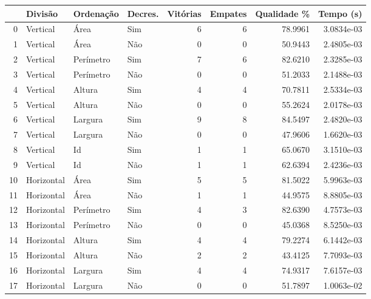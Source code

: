 \begin{tabular}{rlllrrrr}
    \hline
    & Divisão     & Ordenação & Decres. & Vitórias & Empates & Qualidade \% & Tempo (s)  \\
    \hline
    0  & Vertical    & Área      & Sim     & 6        & 6       & 78.9961      & 3.0834e-03 \\
    1  & Vertical    & Área      & Não     & 0        & 0       & 50.9443      & 2.4805e-03 \\
    2  & Vertical    & Perímetro & Sim     & 7        & 6       & 82.6210      & 2.3285e-03 \\
    3  & Vertical    & Perímetro & Não     & 0        & 0       & 51.2033      & 2.1488e-03 \\
    4  & Vertical    & Altura    & Sim     & 4        & 4       & 70.7811      & 2.5334e-03 \\
    5  & Vertical    & Altura    & Não     & 0        & 0       & 55.2624      & 2.0178e-03 \\
    6  & Vertical    & Largura   & Sim     & 9        & 8       & 84.5497      & 2.4820e-03 \\
    7  & Vertical    & Largura   & Não     & 0        & 0       & 47.9606      & 1.6620e-03 \\
    8  & Vertical    & Id        & Sim     & 1        & 1       & 65.0670      & 3.1510e-03 \\
    9  & Vertical    & Id        & Não     & 1        & 1       & 62.6394      & 2.4236e-03 \\
    10 & Horizontal  & Área      & Sim     & 5        & 5       & 81.5022      & 5.9963e-03 \\
    11 & Horizontal  & Área      & Não     & 1        & 1       & 44.9575      & 8.8805e-03 \\
    12 & Horizontal  & Perímetro & Sim     & 4        & 3       & 82.6390      & 4.7573e-03 \\
    13 & Horizontal  & Perímetro & Não     & 0        & 0       & 45.0368      & 8.5250e-03 \\
    14 & Horizontal  & Altura    & Sim     & 4        & 4       & 79.2274      & 6.1442e-03 \\
    15 & Horizontal  & Altura    & Não     & 2        & 2       & 43.4125      & 7.7093e-03 \\
    16 & Horizontal  & Largura   & Sim     & 4        & 4       & 74.9317      & 7.6157e-03 \\
    17 & Horizontal  & Largura   & Não     & 0        & 0       & 51.7897      & 1.0063e-02 \\

\end{tabular}
